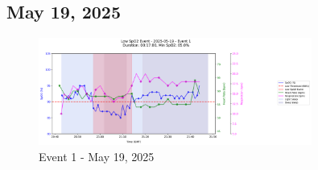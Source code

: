 \documentclass{article}
\begin{document}
\subsection{May 19, 2025}
\begin{figure}[htbp]
    \centering
    \includegraphics[width=0.8\textwidth]{images/2025-05-19_event_1.png}
    \caption{Event 1 - May 19, 2025}
\end{figure}
\clearpage
\end{document}
